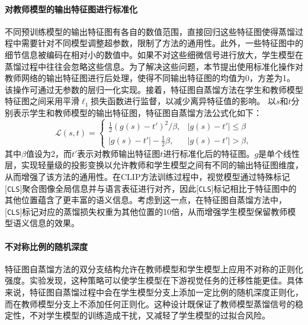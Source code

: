 \paragraph{对教师模型的输出特征图进行标准化} 不同预训练模型的输出特征图有各自的数值范围，直接回归这些特征图使得蒸馏过程中需要针对不同模型调整超参数，限制了方法的通用性。此外，一些特征图中的细节信息被编码在相对小的数值中。如果不对这些细微信号进行放大，学生模型在蒸馏过程中往往会忽略这些信息。为了解决这些问题，本节提出使用标准化操作对教师网络的输出特征图进行后处理，使得不同输出特征图的均值为0，方差为1。%
该操作可通过无参数的层归一化\cite{ba2016layer}实现。接着，特征图自蒸馏方法在学生和教师模型特征图之间采用平滑$\ell_{1}$损失函数进行监督，以减少离异特征值的影响。%
以$s$和$t$分别表示学生和教师模型的输出特征图，特征图自蒸馏方法公式化如下：
\begin{equation}
    \mathcal{L} (s, t) = \begin{cases}
        \frac{1}{2} (g(s) - t')^2/\beta, & | g(s) - t' | \leq \beta \\
        |g(s)-t'|-\frac{1}{2}\beta, & | g(s) - t' | > \beta,
    \end{cases}
    \label{eq:iclip-distill}
\end{equation}
其中$\beta$值设为2，而$t'$表示对教师输出特征图$t$进行标准化后的特征图。$g$是单个线性层，实现轻量级的投影变换以允许教师和学生模型之间有不同的输出特征图维度，从而增强了该方法的通用性。在CLIP方法训练过程中，视觉模型通过特殊标记[\texttt{CLS}]聚合图像全局信息并与语言表征进行对齐，因此[\texttt{CLS}]标记相比于特征图中的其他位置蕴含了更丰富的语义信息。考虑到这一点，在特征图自蒸馏方法中，[\texttt{CLS}]标记对应的蒸馏损失权重为其他位置的10倍，从而增强学生模型保留教师模型语义信息的效果。

\paragraph{不对称比例的随机深度} 特征图自蒸馏方法的双分支结构允许在教师模型和学生模型上应用不对称的正则化强度。实验发现，这种策略可以使学生模型在下游视觉任务的迁移性能更佳。具体来说，特征图自蒸馏过程中会在学生模型分支上添加一定比例的随机深度正则化\cite{huang2016deep}，而在教师模型分支上不添加任何正则化。这种设计既保证了教师模型蒸馏信号的稳定性，不对学生模型的训练造成干扰，又减轻了学生模型的过拟合风险。

